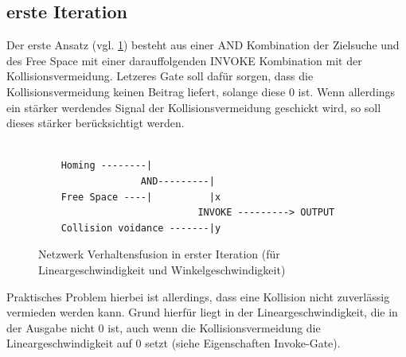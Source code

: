 \documentclass[12pt, a4paper]{report}
\begin{document}
\subsection{erste Iteration}
Der erste Ansatz (vgl. \ref{listing:erstesNetzwerk}) besteht aus einer AND Kombination der Zielsuche und des Free Space mit einer darauffolgenden INVOKE Kombination mit der Kollisionsvermeidung. Letzeres Gate soll dafür sorgen, dass die Kollisionsvermeidung keinen Beitrag liefert, solange diese 0 ist. Wenn allerdings ein stärker werdendes Signal der Kollisionsvermeidung geschickt wird, so soll dieses stärker berücksichtigt werden.
\begin{figure}
    \begin{lstlisting}

    Homing --------|
                  AND---------|  
    Free Space ----|          |x
                            INVOKE ---------> OUTPUT    
    Collision voidance -------|y
    \end{lstlisting}
    \caption{Netzwerk Verhaltensfusion in erster Iteration (für Lineargeschwindigkeit und Winkelgeschwindigkeit)}
    \label{listing:erstesNetzwerk}
\end{figure}
Praktisches Problem hierbei ist allerdings, dass eine Kollision nicht zuverlässig vermieden werden kann. Grund hierfür liegt in der Lineargeschwindigkeit, die in der Ausgabe nicht 0 ist, auch wenn die Kollisionsvermeidung die Lineargeschwindigkeit auf 0 setzt (siehe Eigenschaften Invoke-Gate).
\end{document}
